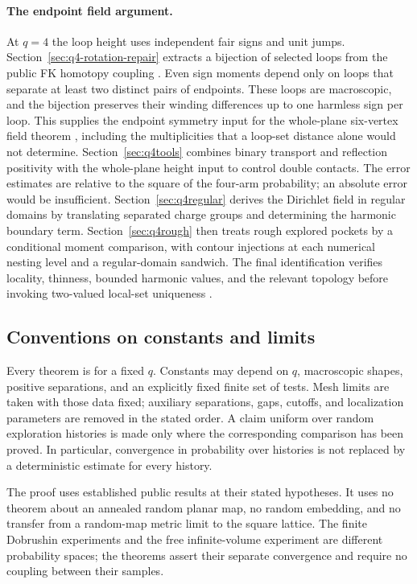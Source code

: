 \paragraph{The endpoint field argument.}
At $q=4$ the loop height uses independent fair signs and unit jumps.
Section~\ref{sec:q4-rotation-repair} extracts a bijection of selected
loops from the public FK homotopy coupling
\citep{DCKKMO2026Rotation}.  Even sign moments depend only on loops
that separate at least two distinct pairs of endpoints.  These loops
are macroscopic, and the bijection preserves their winding differences
up to one harmless sign per loop.  This supplies the endpoint symmetry
input for the whole-plane six-vertex field theorem
\citep{SixVertexGFF2026}, including the multiplicities that a loop-set
distance alone would not determine.
Section~\ref{sec:q4tools} combines binary transport and reflection
positivity with the whole-plane height input to control double
contacts.  The error estimates are relative to the square of the
four-arm probability; an absolute error would be insufficient.
Section~\ref{sec:q4regular} derives the Dirichlet field in regular
domains by translating separated charge groups and determining the
harmonic boundary term.  Section~\ref{sec:q4rough} then treats rough
explored pockets by a conditional moment comparison, with contour
injections at each numerical nesting level and a regular-domain
sandwich.  The final identification verifies locality, thinness,
bounded harmonic values, and the relevant topology before invoking
two-valued local-set uniqueness
\citep{AruSepulvedaWerner2019,AruLupuSepulveda2020}.

\subsection{Conventions on constants and limits}

Every theorem is for a fixed $q$.  Constants may depend on $q$,
macroscopic shapes, positive separations, and an explicitly fixed
finite set of tests.  Mesh limits are taken with those data fixed;
auxiliary separations, gaps, cutoffs, and localization parameters are
removed in the stated order.  A claim uniform over random exploration
histories is made only where the corresponding comparison has been
proved.  In particular, convergence in probability over histories is
not replaced by a deterministic estimate for every history.

The proof uses established public results at their stated hypotheses.
It uses no theorem about an annealed random planar map, no random
embedding, and no transfer from a random-map metric limit to the square
lattice.  The finite Dobrushin experiments and the free infinite-volume
experiment are different probability spaces; the theorems assert their
separate convergence and require no coupling between their samples.
